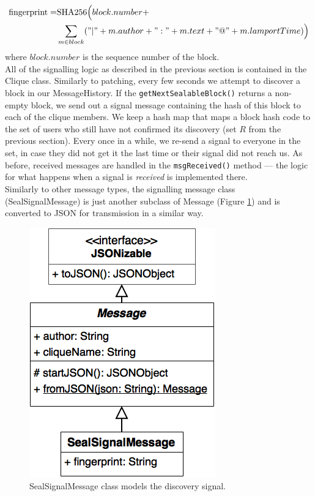 \documentclass[a4paper, twoside, 12pt]{report}
\begin{document}
\begin{equation*}
    \begin{split}
    \text{fingerprint} = & \text{SHA256}\Big(block.number + \\
                        & \sum_{m \in block}("|" + m.author + ":" + m.text + "@" + m.lamportTime)\Big)
    \end{split}
\end{equation*}
where $block.number$ is the sequence number of the block. \\

All of the signalling logic as described in the previous section is contained in the Clique class. Similarly to patching, every few seconds we attempt to discover a block in our MessageHistory. If the \texttt{getNextSealableBlock()} returns a non-empty block, we send out a signal message containing the hash of this block to each of the clique members. We keep a hash map that maps a block hash code to the set of users who still have not confirmed its discovery (set $R$ from the previous section). Every once in a while, we re-send a signal to everyone in the set, in case they did not get it the last time or their signal did not reach us. As before, received messages are handled in the \texttt{msgReceived()} method --- the logic for what happens when a signal is \emph{received} is implemented there. \\

Similarly to other message types, the signalling message class (SealSignalMessage) is just another subclass of Message (Figure \ref{fig:seal_message}) and is converted to JSON for transmission in a similar way.

\begin{figure}[H]
    \captionsetup{width=0.80\textwidth}
    \centering
    \includegraphics[width=0.4\linewidth]{pics/seal_message.png}
    \caption{\label{fig:seal_message} SealSignalMessage class models the discovery signal.}
\end{figure}
\end{document}
